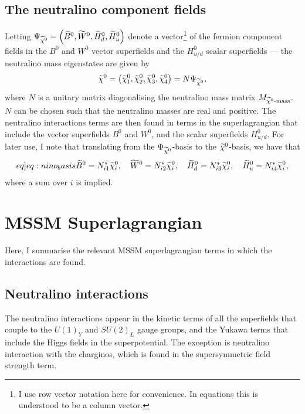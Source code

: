 \documentclass[english, notitlepage]{article}
\begin{document}
    \subsection{The neutralino component fields}
        Letting $\Psi_{\nino} = \pclosed{\bino, \wino, \hinod, \hinou}$ denote a vector\footnote{I use row vector notation here for convenience.
            In equations this is understood to be a column vector.}
        of the fermion component fields in the $B^0$ and $W^0$ vector superfields and the $H^0_{u/d}$ scalar superfields --- the neutralino mass eigenstates are given by
        \begin{align}
            \nino = \pclosed{\nino[1], \nino[2], \nino[3], \nino[4]} = N \Psi_{\nino},
        \end{align}
        where $N$ is a unitary matrix diagonalising the neutralino mass matrix $M_{\nino\text{-mass}}$.
        \(N\) can be chosen such that the neutralino masses are real and positive.
        The neutralino interactions terms are then found in terms in the superlagrangian that include the vector superfields $B^0$ and $W^0$, and the scalar superfields $H^0_{u/d}$.
        For later use, I note that translating from the $\Psi_{\nino}$-basis to the $\nino$-basis, we have that
        \begin{align}
            \label[eq]{eq:nino_basis}
            \bino = N_{i1}^* \nino[i],\quad \wino = N_{i2}^* \nino[i],\quad \hinod = N_{i3}^* \nino[i],\quad \hinou = N_{i4}^* \nino[i],
        \end{align}
        where a sum over $i$ is implied.

\section{MSSM Superlagrangian}
    Here, I summarise the relevant MSSM superlagrangian terms in which the interactions are found.
    \subsection{Neutralino interactions}
        The neutralino interactions appear in the kinetic terms of all the superfields
        that couple to the $U(1)_Y$ and $SU(2)_L$ gauge groups, and the Yukawa terms
        that include the Higgs fields in the superpotential.
        The exception is neutralino interaction with the charginos, which is found in the supersymmetric field strength term.
\end{document}
